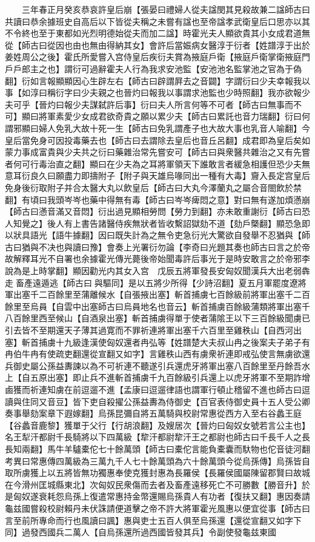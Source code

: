　　三年春正月癸亥恭哀許皇后崩【張晏曰禮婦人從夫諡閔其見殺故兼二諡師古曰共讀曰恭余據班史自高后以下皆從夫稱之未嘗有諡也至帝諡孝武衛皇后口思亦以其不令終也至于東都如光烈明德始從夫而加二諡】時霍光夫人顯欲貴其小女成君道無從【師古曰從因也由也無由得納其女】會許后當娠病女醫淳于衍者【姓譜淳于出於姜姓周公之後】霍氏所愛嘗入宫侍皇后疾衍夫賞為掖庭戶衛【掖庭戶衛掌衛掖庭門戶戶郎主之也】謂衍可過辭霍夫人行為我求安池監【安池池名監掌池之官為于偽翻】衍如言報顯顯因心生辟左右【師古曰辟謂屛去之音闢】字謂衍曰少夫幸報我以事【如淳曰稱衍字曰少夫親之也晉灼曰報我以事謂求池監也少時照翻】我亦欲報少夫可乎【晉灼曰報少夫謀弑許后事】衍曰夫人所言何等不可者【師古曰無事而不可】顯曰將軍素愛少女成君欲奇貴之願以累少夫【師古曰累託也音力瑞翻】衍曰何謂邪顯曰婦人免乳大故十死一生【師古曰免乳謂產子也大故大事也乳音人喻翻】今皇后當免身可因投毒藥去也【師古曰去謂除去皇后也音丘呂翻】成君即為皇后矣如蒙力事成富貴與少夫共之衍曰藥雜治常先嘗安可【師古曰與衆醫共雜治之又有先嘗者何可行毒治直之翻】顯曰在少夫為之耳將軍領天下誰敢言者緩急相護但恐少夫無意耳衍良久曰願盡力即擣附子【附子與天雄烏喙同出一種有大毒】齎入長定宫皇后免身後衍取附子并合太醫大丸以飲皇后【師古曰大丸今澤蘭丸之屬合音閤飲於禁翻】有頃曰我頭岑岑也藥中得無有毒【師古曰岑岑痺悶之意】對曰無有遂加煩懣崩【師古曰懣音滿又音悶】衍出過見顯相勞問【勞力到翻】亦未敢重謝衍【師古曰恐人知覺之】後人有上書告諸醫侍疾無狀者皆收繫詔獄劾不道【劾戶槩翻】顯恐急即以狀具語光【語牛據翻】因曰既失計為之無令吏急衍光大驚欲自發舉不忍猶與【師古曰猶與不决也與讀曰豫】會奏上光署衍勿論【李奇曰光題其奏也師古曰言之於帝故解釋耳光不自署也余據霍光傳光薨後帝始聞毒許后事光于是時安敢言之於帝邪李說為是上時掌翻】顯因勸光内其女入宫　戊辰五將軍發長安匈奴聞漢兵大出老弱犇走畜產遠遁逃【師古曰與驅同】是以五將少所得【少詩沼翻】夏五月軍罷度遼將軍出塞千二百餘里至蒲離候水【自張掖出塞】斬首捕虜七百餘級前將軍出塞千二百餘里至烏員【自雲中出塞師古曰烏員地名也音云】斬首捕虜百餘級蒲類將軍出塞千八百餘里西至候山【自酒泉出塞】斬首捕虜得單于使者蒲隂王以下三百餘級聞虜已引去皆不至期還天子薄其過寛而不罪祈連將軍出塞千六百里至雞秩山【自西河出塞】斬首捕虜十九級逢漢使匈奴還者冉弘等【姓譜楚大夫叔山冉之後案夫子弟子有冉伯牛冉有使疏吏翻還從宣翻又如字】言雞秩山西有虜衆祈連即戒弘使言無虜欲還兵御史屬公孫益夀諫以為不可祈連不聽遂引兵還虎牙將軍出塞八百餘里至丹餘吾水上【自五原出塞】即止兵不進斬首捕虜千九百餘級引兵還上以虎牙將軍不至期詐增鹵獲而祈連知虜在前逗遛不進【孟康曰逗遛律語也謂軍行頓止稽留不進也師古曰逗讀與住同又音豆】皆下吏自殺擢公孫益夀為侍御史【百官表侍御史員十五人受公卿奏事舉劾案章下遐嫁翻】烏孫昆彌自將五萬騎與校尉常惠從西方入至右谷蠡王庭【谷蠡音鹿黎】獲單于父行【行胡浪翻】及嫂居次【晉灼曰匈奴女號若言公主也】名王犁汗都尉千長騎將以下四萬級【犂汗都尉犂汗王之都尉也師古曰千長千人之長長知兩翻】馬牛羊驢橐佗七十餘萬頭【師古曰橐佗言能負橐囊而馱物也佗音徒河翻　考異曰常惠傳四萬級為三萬九千人七十餘萬頭為六十餘萬頭今從烏孫傳】烏孫皆自取所虜獲上以五將皆無功獨惠奉使克獲封惠為長羅侯【長羅侯國屬陳留郡賢曰故城在今滑州匡城縣東北】次匈奴民衆傷而去者及畜產遠移死亡不可勝數【勝音升】於是匈奴遂衰耗怨烏孫上復遣常惠持金幣還賜烏孫貴人有功者【復扶又翻】惠因奏請龜兹國嘗殺校尉賴丹未伏誅請便道擊之帝不許大將軍霍光風惠以便宜從事【師古曰言至前所專命而行也風讀曰諷】惠與吏士五百人俱至烏孫還【還從宣翻又如字下同】過發西國兵二萬人【自烏孫還所過西國皆發其兵】令副使發龜兹東國